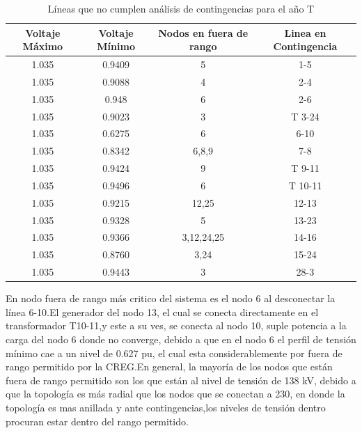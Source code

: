 \documentclass{article}
\begin{document}
\begin{table}[H]
\centering
\caption{Líneas que no cumplen análisis de contingencias para el año T}
\begin{tabular}{|c|c|c|c|}
\hline
Voltaje Máximo & Voltaje Mínimo & Nodos en fuera de rango & Linea en Contingencia \\ \hline
1.035          & 0.9409         & 5                       & 1-5                   \\ \hline
1.035          & 0.9088         & 4                       & 2-4                   \\ \hline
1.035          & 0.948          & 6                       & 2-6                   \\ \hline
1.035          & 0.9023         & 3                       & T 3-24                  \\ \hline
1.035          & 0.6275         & 6                       & 6-10                  \\ \hline
1.035          & 0.8342         & 6,8,9                   & 7-8                   \\ \hline
1.035          & 0.9424         & 9                       & T 9-11                  \\ \hline
1.035          & 0.9496         & 6                       & T 10-11                 \\ \hline
1.035          & 0.9215         & 12,25                   & 12-13                 \\ \hline
1.035          & 0.9328         & 5                       & 13-23                 \\ \hline
1.035          & 0.9366         & 3,12,24,25              & 14-16                 \\ \hline
1.035          & 0.8760         & 3,24                    & 15-24                 \\ \hline
1.035          & 0.9443         & 3                       & 28-3                  \\ \hline
\end{tabular}
\end{table}
En nodo fuera de rango más critico del sistema es el nodo 6 al desconectar la línea 6-10.El generador del nodo 13, el cual se conecta directamente en el transformador T10-11,y este a su ves, se conecta al nodo 10, suple potencia a la carga del nodo 6 donde no converge, debido a que en el nodo 6 el perfil de tensión mínimo cae a un nivel de 0.627 pu, el cual esta considerablemente por fuera de rango permitido por la CREG.En general, la mayoría de los nodos que están fuera de rango permitido son los que están al nivel de tensión de 138 kV, debido a que la topología es más radial que los nodos que se conectan a 230, en donde la topología es mas anillada y ante contingencias,los niveles de tensión dentro procuran estar dentro del rango permitido.
\end{document}
